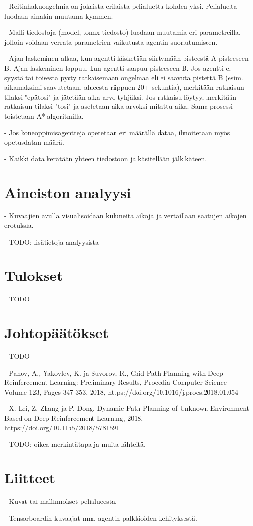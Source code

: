 \documentclass[utf8]{gradu3}
\begin{document}
- Reitinhakuongelmia on jokaista erilaista pelialuetta kohden yksi. Pelialueita luodaan ainakin muutama kymmen.

- Malli-tiedostoja (model, .onnx-tiedosto) luodaan muutamia eri parametreilla, jolloin voidaan verrata parametrien vaikutusta agentin suoriutumiseen.

- Ajan laskeminen alkaa, kun agentti käsketään siirtymään pisteestä A pisteeseen B.
Ajan laskeminen loppuu, kun agentti saapuu pisteeseen B. Jos agentti ei syystä tai toisesta
pysty ratkaisemaan ongelmaa eli ei saavuta pistettä B (esim. aikamaksimi saavutetaan, alueesta riippuen 20+ sekuntia), merkitään ratkaisun tilaksi "epätosi"
ja jätetään aika-arvo tyhjäksi. Jos ratkaisu löytyy, merkitään ratkaisun tilaksi "tosi" ja
asetetaan aika-arvoksi mitattu aika. Sama prosessi toistetaan A*-algoritmilla.

- Jos koneoppimisagentteja opetetaan eri määrällä dataa, ilmoitetaan myös opetusdatan määrä.

- Kaikki data kerätään yhteen tiedostoon ja käsitellään jälkikäteen.

\chapter{Aineiston analyysi}

- Kuvaajien avulla visualisoidaan kuluneita aikoja ja vertaillaan saatujen aikojen erotuksia.

- TODO: lisätietoja analyysista

\chapter{Tulokset}

- TODO

\chapter{Johtopäätökset}

- TODO

\printbibliography

- Panov, A., Yakovlev, K. ja Suvorov, R., Grid Path Planning with Deep
Reinforcement Learning: Preliminary Results, Procedia Computer Science
Volume 123, Pages 347-353, 2018,
https://doi.org/10.1016/j.procs.2018.01.054

- X. Lei, Z. Zhang ja P. Dong, Dynamic Path Planning of Unknown
Environment Based on Deep Reinforcement Learning, 2018,
https://doi.org/10.1155/2018/5781591

- TODO: oikea merkintätapa ja muita lähteitä.

\chapter{Liitteet}

- Kuvat tai mallinnokset pelialueesta.

- Tensorboardin kuvaajat mm. agentin palkkioiden kehityksestä.
\end{document}
